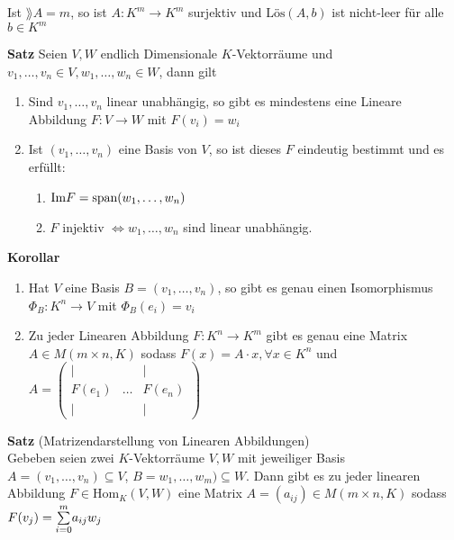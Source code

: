 Ist $\rang A = m$, so ist $A: K^m \rightarrow K^m$ surjektiv und $\text{Lös}(A,b)$ ist nicht-leer für alle $b \in K^m$\\
\begin{mdframed}
\textbf{Satz} \quad Seien $V, W$ endlich Dimensionale $K$-Vektorräume und $v_1, \ldots, v_n \in V, w_1, \ldots, w_n \in W$, dann gilt
\begin{enumerate}[{(}1{.)}]
    \item	Sind $v_1, \ldots, v_n$ linear unabhängig, so gibt es mindestens eine Lineare Abbildung $F: V \rightarrow W$ mit $F(v_i) = w_i$
    
    \item Ist $(v_1, \ldots, v_n)$ eine Basis von $V$, so ist dieses $F$ eindeutig bestimmt und es erfüllt:
    \begin{enumerate}[{(}a{)}]
        \item $\text{Im} F = \text{span}(w_1, \ldots, w_n)$
        
        \item $F$ injektiv $\Leftrightarrow w_1, \ldots, w_n$ sind linear unabhängig. 
    \end{enumerate}
\end{enumerate}
\end{mdframed}
\textbf{Korollar}
\begin{enumerate}[{(}a{)}]
    \item Hat $V$ eine Basis $B = (v_1, \ldots, v_n)$, so gibt es genau einen Isomorphismus $\Phi_B: K^n \rightarrow V$ mit $\Phi_B(e_i) = v_i$
    
    \item Zu jeder Linearen Abbildung $F: K^n \rightarrow K^m$ gibt es genau eine Matrix $A \in M(m\times n,K)$ sodass $F(x) = A \cdot x, \forall x \in K^n$ und $A = \begin{pmatrix}
    | &  & |\\
    F(e_1) & \ldots & F(e_n)\\
    | & & |
    \end{pmatrix}$
\end{enumerate}
\textbf{Satz} (Matrizendarstellung von Linearen Abbildungen)\\
Gebeben seien zwei $K$-Vektorräume $V,W$ mit jeweiliger Basis $A = (v_1, \ldots, v_n) \subseteq V$, $B = w_1, \ldots, w_m) \subseteq W$. Dann gibt es zu jeder linearen Abbildung $F \in \text{Hom}_K(V,W)$ eine Matrix $A = \left(a_{ij}\right) \in M(m\times n,K)$ sodass $F(v_j) = \underset{i = 0}{\overset{m}{\sum}} a_{ij}w_j$\\
